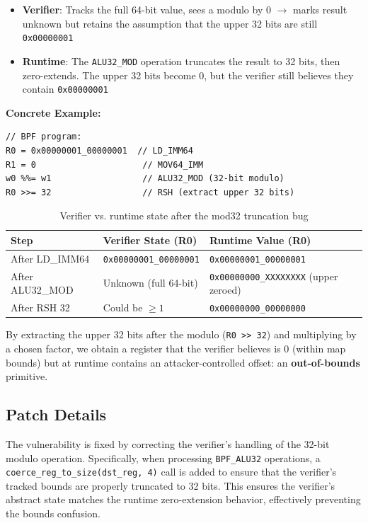 \begin{itemize}
    \item \textbf{Verifier}: Tracks the full 64-bit value, sees a modulo by 0 $\rightarrow$ marks result unknown but retains the assumption that the upper 32 bits are still \texttt{0x00000001}
    \item \textbf{Runtime}: The \texttt{ALU32\_MOD} operation truncates the result to 32 bits, then zero-extends. The upper 32 bits become 0, but the verifier still believes they contain \texttt{0x00000001}
\end{itemize}

\textbf{Concrete Example:}

\begin{lstlisting}[style=kernel,caption={Bounds mismatch via mod32 truncation}]
// BPF program:
R0 = 0x00000001_00000001  // LD_IMM64
R1 = 0                     // MOV64_IMM
w0 %%= w1                  // ALU32_MOD (32-bit modulo)
R0 >>= 32                  // RSH (extract upper 32 bits)
\end{lstlisting}

\begin{table}[H]
\centering
\begin{tabular}{@{}lll@{}}
\toprule
\textbf{Step} & \textbf{Verifier State (R0)} & \textbf{Runtime Value (R0)} \\
\midrule
After LD\_IMM64 & \texttt{0x00000001\_00000001} & \texttt{0x00000001\_00000001} \\
After ALU32\_MOD & Unknown (full 64-bit) & \texttt{0x00000000\_XXXXXXXX} (upper zeroed) \\
After RSH 32 & Could be $\geq 1$ & \texttt{0x00000000\_00000000} \\
\bottomrule
\end{tabular}
\caption{Verifier vs. runtime state after the mod32 truncation bug}
\end{table}

By extracting the upper 32 bits after the modulo (\texttt{R0 >> 32}) and multiplying by a chosen factor, we obtain a register that the verifier believes is 0 (within map bounds) but at runtime contains an attacker-controlled offset: an \textbf{out-of-bounds} primitive.

\subsection{Patch Details}

The vulnerability is fixed by correcting the verifier's handling of the 32-bit modulo operation. Specifically, when processing \texttt{BPF\_ALU32} operations, a \texttt{coerce\_reg\_to\_size(dst\_reg, 4)} call is added to ensure that the verifier's tracked bounds are properly truncated to 32 bits. This ensures the verifier's abstract state matches the runtime zero-extension behavior, effectively preventing the bounds confusion.

